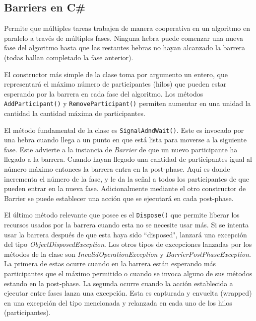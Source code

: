 \documentclass[10pt]{article} %
\newcommand{\csl}[1]{\colorbox{backcolour}{\texttt{#1}}}
\begin{document}
\subsection{Barriers en C\#}

Permite que múltiples tareas trabajen de manera cooperativa en un algoritmo en paralelo a través de múltiples fases. Ninguna hebra puede comenzar una nueva fase del algoritmo hasta que las restantes hebras no hayan alcanzado la barrera (todas hallan completado la fase anterior).

El constructor m\'as simple de la clase toma por argumento un entero, que representar\'a el m\'aximo n\'umero de participantes (hilos) que pueden estar esperando por la barrera en cada fase del algoritmo. Los m\'etodos \csl{AddParticipant()} y \csl{RemoveParticipant()} permiten aumentar en una unidad la cantidad la cantidad m\'axima de participantes. 

El m\'etodo fundamental de la clase es \csl{SignalAdndWait()}. Este es invocado por una hebra cuando llega a un punto en que est\'a lista para moverse a la siguiente fase. Este advierte a la instancia de \emph{Barrier} de que un nuevo participante ha llegado a la barrera. Cuando hayan llegado una cantidad de participantes igual al n\'umero m\'aximo entonces la barrera entra en la post-phase. Aqu\'i es donde incrementa el n\'umero de la fase, y le da la se\~nal a todos los participantes de que pueden entrar en la nueva fase. Adicionalmente mediante el otro constructor de Barrier se puede establecer una acci\'on que se ejecutar\'a en cada post-phase. 

El \'ultimo m\'etodo relevante que posee es el \csl{Dispose()} que permite liberar los recursos usados por la barrera cuando esta no se necesite usar m\'as. Si se intenta usar la barrera despu\'es de que esta haya sido ``disposed", lanzar\'a una excepci\'on del tipo \emph{ObjectDisposedException}. Los otros tipos de excepciones lanzadas por los m\'etodos de la clase son \emph{InvalidOperationException} y \emph{BarrierPostPhaseException}. La primera de estas ocurre cuando en la barrera est\'an esperando m\'as participantes que el m\'aximo permitido o cuando se invoca alguno de sus m\'etodos estando en la post-phase. La segunda ocurre cuando la acci\'on establecida a ejecutar entre fases lanza una excepci\'on. Esta es capturada y envuelta (wrapped) en una excepci\'on del tipo mencionada y relanzada en cada uno de los hilos (participantes).
\end{document}
